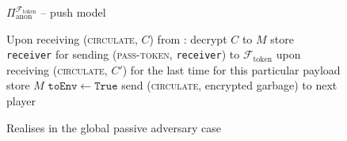 \begin{figure}[H]
\begin{protocolbox}{$\Pi_{\mathrm{anon}}^{\mathcal{F}_{\mathrm{token}}}$ --
    push model}
\begin{algorithmic}[1]
        \State Upon receiving (\textsc{circulate}, $C$) from \bob:
        \Indent
          \State decrypt $C$ to $M$
            \State store \texttt{receiver} for sending (\textsc{pass-token},
            \texttt{receiver}) to $\mathcal{F}_{\mathrm{token}}$ upon receiving
            (\textsc{circulate}, $C'$) for the last time for this particular
            payload
            \State store $M$
            \State $\mathtt{toEnv} \gets \mathtt{True}$
          \EndIf
          \State send (\textsc{circulate}, encrypted garbage) to next player
        \EndIndent
      \end{algorithmic}
    \end{protocolbox}
    \caption{Realises \anonfunc in the global passive adversary case}
    \label{alg:anonprot:push}
  \end{figure}

